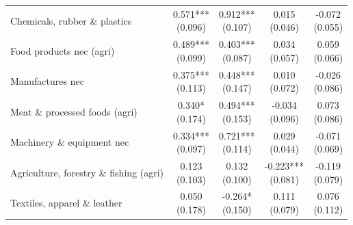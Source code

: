 \begin{table}[t]
\begin{tabular*}{\linewidth}{@{\extracolsep{\fill}}l|cccc}
Chemicals, rubber \& plastics & \shortstack[l]{0.571*** \\(0.096)} & \shortstack[l]{0.912*** \\(0.107)} & \shortstack[l]{0.015 \\(0.046)} & \shortstack[l]{-0.072 \\(0.055)} \\ 
Food products nec (agri) & \shortstack[l]{0.489*** \\(0.099)} & \shortstack[l]{0.403*** \\(0.087)} & \shortstack[l]{0.034 \\(0.057)} & \shortstack[l]{0.059 \\(0.066)} \\ 
Manufactures nec & \shortstack[l]{0.375*** \\(0.113)} & \shortstack[l]{0.448*** \\(0.147)} & \shortstack[l]{0.010 \\(0.072)} & \shortstack[l]{-0.026 \\(0.086)} \\ 
Meat \& processed foods (agri) & \shortstack[l]{0.340* \\(0.174)} & \shortstack[l]{0.494*** \\(0.153)} & \shortstack[l]{-0.034 \\(0.096)} & \shortstack[l]{0.073 \\(0.086)} \\ 
Machinery \& equipment nec & \shortstack[l]{0.334*** \\(0.097)} & \shortstack[l]{0.721*** \\(0.114)} & \shortstack[l]{0.029 \\(0.044)} & \shortstack[l]{-0.071 \\(0.069)} \\ 
Agriculture, forestry \& fishing (agri) & \shortstack[l]{0.123 \\(0.103)} & \shortstack[l]{0.132 \\(0.100)} & \shortstack[l]{-0.223*** \\(0.081)} & \shortstack[l]{-0.119 \\(0.079)} \\ 
Textiles, apparel \& leather & \shortstack[l]{0.050 \\(0.178)} & \shortstack[l]{-0.264* \\(0.150)} & \shortstack[l]{0.111 \\(0.079)} & \shortstack[l]{0.076 \\(0.112)} \\ 

\end{tabular*}
\end{table}
